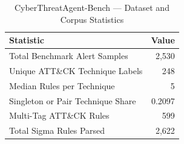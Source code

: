 \begin{table}[t]
\centering
\caption{CyberThreatAgent-Bench --- Dataset and Corpus Statistics}
\label{tab:dataset}
\begin{tabular}{lr}
\toprule
Statistic & Value \\ \midrule
Total Benchmark Alert Samples & 2,530 \\
Unique ATT\&CK Technique Labels & 248 \\
Median Rules per Technique & 5 \\
Singleton or Pair Technique Share & 0.2097 \\
Multi-Tag ATT\&CK Rules & 599 \\
Total Sigma Rules Parsed & 2,622 \\
\bottomrule
\end{tabular}
\end{table}
